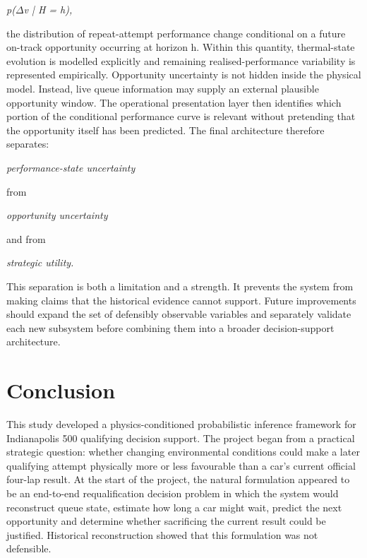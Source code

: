 \begin{center}\textit{p(\ensuremath{\Delta}v | H = h),}\end{center}

the distribution of repeat-attempt performance change conditional on a future on-track opportunity occurring at horizon h. Within this quantity, thermal-state evolution is modelled explicitly and remaining realised-performance variability is represented empirically. Opportunity uncertainty is not hidden inside the physical model. Instead, live queue information may supply an external plausible opportunity window. The operational presentation layer then identifies which portion of the conditional performance curve is relevant without pretending that the opportunity itself has been predicted. The final architecture therefore separates:

\begin{center}\textit{performance-state uncertainty}\end{center}

from

\begin{center}\textit{opportunity uncertainty}\end{center}

and from

\begin{center}\textit{strategic utility.}\end{center}

This separation is both a limitation and a strength. It prevents the system from making claims that the historical evidence cannot support. Future improvements should expand the set of defensibly observable variables and separately validate each new subsystem before combining them into a broader decision-support architecture.

\section{Conclusion}
This study developed a physics-conditioned probabilistic inference framework for Indianapolis 500 qualifying decision support. The project began from a practical strategic question: whether changing environmental conditions could make a later qualifying attempt physically more or less favourable than a car's current official four-lap result. At the start of the project, the natural formulation appeared to be an end-to-end requalification decision problem in which the system would reconstruct queue state, estimate how long a car might wait, predict the next opportunity and determine whether sacrificing the current result could be justified. Historical reconstruction showed that this formulation was not defensible.


